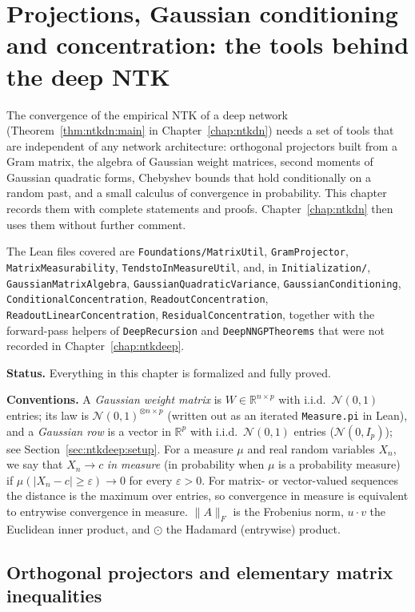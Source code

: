\chapter{Projections, Gaussian conditioning and concentration: the tools behind the deep NTK}\label{chap:ntkcond}

The convergence of the empirical NTK of a deep network (Theorem~\ref{thm:ntkdn:main} in Chapter~\ref{chap:ntkdn}) needs a set of tools that are independent of any network architecture: orthogonal projectors built from a Gram matrix, the algebra of Gaussian weight matrices, second moments of Gaussian quadratic forms, Chebyshev bounds that hold conditionally on a random past, and a small calculus of convergence in probability. This chapter records them with complete statements and proofs. Chapter~\ref{chap:ntkdn} then uses them without further comment.

The Lean files covered are \texttt{Foundations/MatrixUtil}, \texttt{GramProjector}, \texttt{MatrixMeasurability}, \texttt{TendstoInMeasureUtil}, and, in \texttt{Initialization/}, \texttt{GaussianMatrixAlgebra}, \texttt{GaussianQuadraticVariance}, \texttt{GaussianConditioning}, \texttt{ConditionalConcentration}, \texttt{ReadoutConcentration}, \texttt{ReadoutLinearConcentration}, \texttt{ResidualConcentration}, together with the forward-pass helpers of \texttt{DeepRecursion} and \texttt{DeepNNGPTheorems} that were not recorded in Chapter~\ref{chap:ntkdeep}.

\medskip\noindent\textbf{Status.}
Everything in this chapter is formalized and fully proved.

\medskip\noindent\textbf{Conventions.}
A \emph{Gaussian weight matrix} is $W\in\mathbb R^{n\times p}$ with i.i.d.\ $\mathcal N(0,1)$ entries; its law is $\mathcal N(0,1)^{\otimes n\times p}$ (written out as an iterated \texttt{Measure.pi} in Lean), and a \emph{Gaussian row} is a vector in $\mathbb R^p$ with i.i.d.\ $\mathcal N(0,1)$ entries ($\mathcal N(0,I_p)$); see Section~\ref{sec:ntkdeep:setup}.
For a measure $\mu$ and real random variables $X_n$, we say that $X_n\to c$ \emph{in measure} (in probability when $\mu$ is a probability measure) if $\mu(|X_n-c|\ge\varepsilon)\to0$ for every $\varepsilon>0$. For matrix- or vector-valued sequences the distance is the maximum over entries, so convergence in measure is equivalent to entrywise convergence in measure. $\|A\|_F$ is the Frobenius norm, $u\cdot v$ the Euclidean inner product, and $\odot$ the Hadamard (entrywise) product.


\section{Orthogonal projectors and elementary matrix inequalities}\label{sec:ntkcond:projectors}

